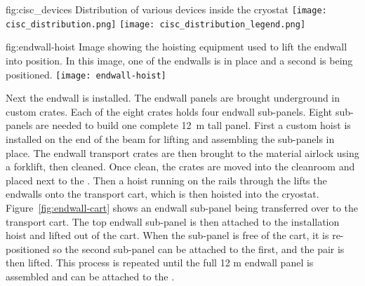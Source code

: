 \begin{dunefigure}{fig:cisc_devices}
  {Distribution of various %
   devices inside the cryostat}
  \texttt{[image: cisc\_distribution.png]}
  \texttt{[image: cisc\_distribution\_legend.png]}
\end{dunefigure}

\begin{dunefigure}{fig:endwall-hoist}
  {Image showing the hoisting equipment used to lift the endwall into position. In this image, one of the endwalls is in place and a second is being positioned.}
\texttt{[image: endwall-hoist]}
\end{dunefigure}

Next the  endwall is installed. The endwall panels are brought underground in custom crates. Each of the eight crates holds four endwall sub-panels.  Eight sub-panels are needed to build one complete \SI{12}{m} tall panel.  First a custom hoist is installed on the end of the  beam for lifting and assembling the sub-panels in place. The endwall transport crates are then brought to the material airlock using a forklift, then cleaned.  Once clean, the crates are moved into the cleanroom and placed next to the . Then a hoist running on the rails through the  lifts the endwalls onto the transport cart, which is then hoisted into the cryostat. Figure~\ref{fig:endwall-cart} shows an endwall sub-panel being transferred over to the transport cart. The top endwall sub-panel is then attached to the installation hoist and lifted out of the cart. When the sub-panel is free of  the cart, it is re-positioned so the second sub-panel can be attached to the first, and the pair is then lifted. This process is repeated until the full 12 \si{m} endwall  panel is assembled and can be attached to the . 
